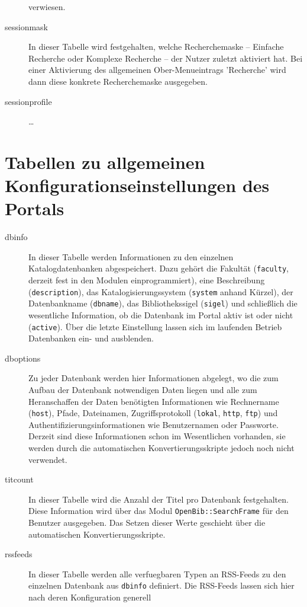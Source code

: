 \documentclass[11pt, twoside, a4paper, BCOR8mm, DIV12, bibtotoc,idxtotoc]{scrbook}
\begin{document}
\begin{description}
  verwiesen.
\item[sessionmask] In dieser Tabelle wird festgehalten, welche
  Recherchemaske -- Einfache Recherche oder Komplexe Recherche -- der
  Nutzer zuletzt aktiviert hat. Bei einer Aktivierung des allgemeinen
  Ober-Menueintrags 'Recherche' wird dann diese konkrete
  Recherchemaske aus\-ge\-ge\-ben.
\item[sessionprofile] \dots
\end{description}

\section{Tabellen zu allgemeinen Konfigurationseinstellungen des Portals}

\begin{description}
\item[dbinfo] In dieser Tabelle werden Informationen zu den einzelnen
  Katalogdatenbanken ab\-ge\-spei\-chert. Dazu gehört die Fakultät
  (\texttt{faculty}, derzeit fest in den Modulen einprogrammiert),
  eine Beschreibung (\texttt{description}), das Katalogisierungssystem
  (\texttt{system} anhand Kürzel), der Datenbankname
  (\texttt{dbname}), das Bibliothekssigel (\texttt{sigel}) und
  schließlich die wesentliche Information, ob die Daten\-bank im Portal
  aktiv ist oder nicht (\texttt{active}). Über die letzte Einstellung
  lassen sich im laufenden Betrieb Daten\-banken ein- und ausblenden.
\item[dboptions] Zu jeder Daten\-bank werden hier Informationen
  abgelegt, wo die zum Aufbau der Daten\-bank notwendigen Daten liegen
  und alle zum Heranschaffen der Daten benötigten Informationen wie
  Rechnername (\texttt{host}), Pfade, Dateinamen, Zugriffsprotokoll
  (\texttt{lokal}, \texttt{http}, \texttt{ftp}) und
  Authentifizierungsinformationen wie Benutzernamen oder Passworte.
  Derzeit sind diese Informationen schon im Wesentlichen vorhanden,
  sie werden durch die automatischen Konvertierungsskripte jedoch noch
  nicht verwendet.
\item[titcount] In dieser Tabelle wird die Anzahl der Titel pro
  Daten\-bank festgehalten. Diese Information wird über das Modul
  \texttt{OpenBib::SearchFrame} für den Benutzer ausgegeben. Das Setzen
  dieser Werte geschieht über die automatischen
  Konvertierungsskripte.
\item[rssfeeds] In dieser Tabelle werden alle verfuegbaren Typen an RSS-Feeds
  zu den einzelnen Daten\-bank aus \texttt{dbinfo} definiert. Die
  RSS-Feeds lassen sich hier nach deren Konfiguration generell

\end{description}
\end{document}
